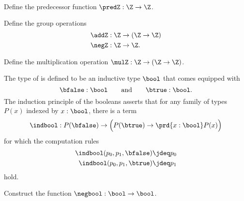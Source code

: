 \begin{exercises}
  \exitem
  \begin{subexenum}
  \item \label{ex:int_pred}Define the predecessor function $\predZ:\Z\to \Z$.
  \item \label{ex:int_group_ops}Define the group operations
    \begin{align*}
      \addZ & : \Z \to (\Z \to \Z) \\*
      \negZ & : \Z \to \Z.
    \end{align*}
  \item \label{ex:mulZ}Define the multiplication operation $\mulZ : \Z \to (\Z \to \Z)$.
  \end{subexenum}
  \exitem \label{ex:bool}The type of  is defined to be an inductive type $\bool$ that comes equipped with
  \begin{equation*}
    \bfalse : \bool\qquad\text{and}\qquad\btrue : \bool.
  \end{equation*}
  The induction principle of the booleans asserts that for any family of types $P(x)$ indexed by $x:\bool$, there is a term
  \begin{equation*}
    \indbool : P(\bfalse)\to \Big(P(\btrue)\to \prd{x:\bool}P(x)\Big)
  \end{equation*}
  for which the computation rules
  \begin{align*}
    \indbool(p_0,p_1,\bfalse) & \jdeq p_0 \\*
    \indbool(p_0,p_1,\btrue) & \jdeq p_1
  \end{align*}
  hold.
  \begin{subexenum}
  \item Construct the  function $\negbool:\bool\to\bool$.

\end{subexenum}
\end{exercises}
